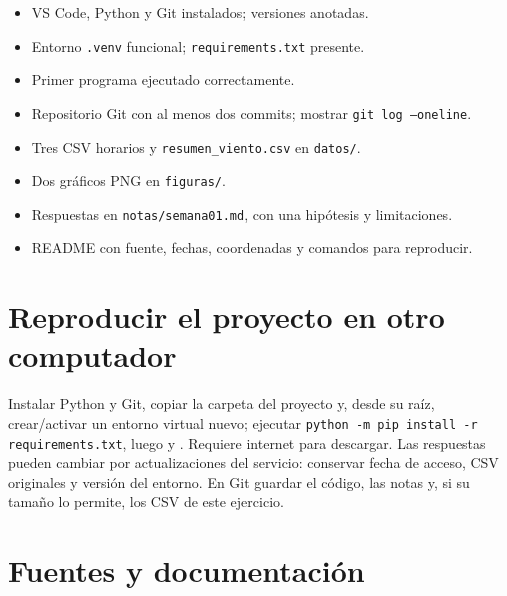 \documentclass[11pt,a4paper]{article}
\begin{document}
\begin{itemize}[label=--,leftmargin=*]

\item VS Code, Python y Git instalados; versiones anotadas.

\item Entorno \texttt{.venv} funcional; \texttt{requirements.txt} presente.

\item Primer programa ejecutado correctamente.

\item Repositorio Git con al menos dos commits; mostrar \texttt{git log --oneline}.

\item Tres CSV horarios y \texttt{resumen\_viento.csv} en \texttt{datos/}.

\item Dos gráficos PNG en \texttt{figuras/}.

\item Respuestas en \texttt{notas/semana01.md}, con una hipótesis y limitaciones.

\item README con fuente, fechas, coordenadas y comandos para reproducir.

\end{itemize}

\section*{Reproducir el proyecto en otro computador}

Instalar Python y Git, copiar la carpeta del proyecto y, desde su raíz, crear/activar un entorno virtual nuevo; ejecutar \texttt{python -m pip install -r requirements.txt}, luego  y . Requiere internet para descargar. Las respuestas pueden cambiar por actualizaciones del servicio: conservar fecha de acceso, CSV originales y versión del entorno. En Git guardar el código, las notas y, si su tamaño lo permite, los CSV de este ejercicio.

\section*{Fuentes y documentación}
\end{document}
